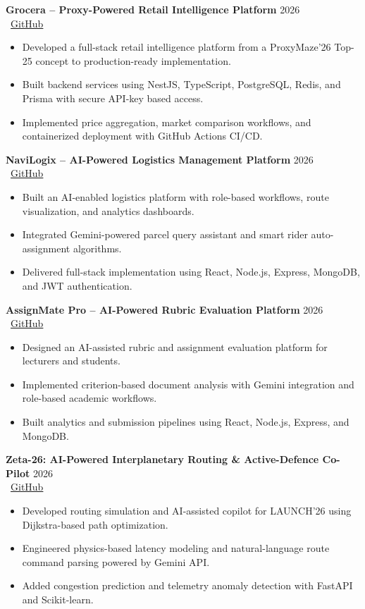\documentclass[a4paper,11pt]{article}
\begin{document}
\textbf{Grocera -- Proxy-Powered Retail Intelligence Platform} \hfill 2026
\\ \faGithub\ \href{https://github.com/lakaThabrew/Grocera}{GitHub}
\begin{itemize}
    \item Developed a full-stack retail intelligence platform from a ProxyMaze'26 Top-25 concept to production-ready implementation.
    \item Built backend services using NestJS, TypeScript, PostgreSQL, Redis, and Prisma with secure API-key based access.
    \item Implemented price aggregation, market comparison workflows, and containerized deployment with GitHub Actions CI/CD.
\end{itemize}

\textbf{NaviLogix -- AI-Powered Logistics Management Platform} \hfill 2026
\\ \faGithub\ \href{https://github.com/lakaThabrew/navilogix}{GitHub}
\begin{itemize}
    \item Built an AI-enabled logistics platform with role-based workflows, route visualization, and analytics dashboards.
    \item Integrated Gemini-powered parcel query assistant and smart rider auto-assignment algorithms.
    \item Delivered full-stack implementation using React, Node.js, Express, MongoDB, and JWT authentication.
\end{itemize}

\textbf{AssignMate Pro -- AI-Powered Rubric Evaluation Platform} \hfill 2026
\\ \faGithub\ \href{https://github.com/lakaThabrew/AssignMate}{GitHub}
\begin{itemize}
    \item Designed an AI-assisted rubric and assignment evaluation platform for lecturers and students.
    \item Implemented criterion-based document analysis with Gemini integration and role-based academic workflows.
    \item Built analytics and submission pipelines using React, Node.js, Express, and MongoDB.
\end{itemize}

\textbf{Zeta-26: AI-Powered Interplanetary Routing \& Active-Defence Co-Pilot} \hfill 2026
\\ \faGithub\ \href{https://github.com/Launch26/echo-binary}{GitHub}
\begin{itemize}
    \item Developed routing simulation and AI-assisted copilot for LAUNCH'26 using Dijkstra-based path optimization.
    \item Engineered physics-based latency modeling and natural-language route command parsing powered by Gemini API.
    \item Added congestion prediction and telemetry anomaly detection with FastAPI and Scikit-learn.
\end{itemize}
\end{document}
